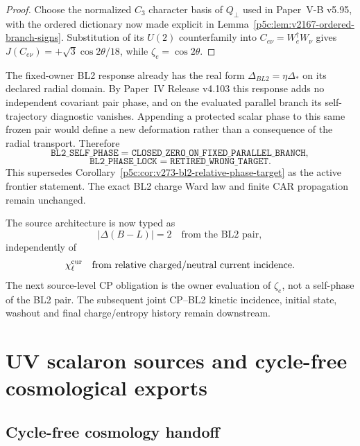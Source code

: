 \documentclass[12pt,a4paper]{article}
\begin{document}
\begin{proof}
Choose the normalized $C_3$ character basis of $Q_\perp$ used in Paper~V-B
v5.95, with the ordered dictionary now made explicit in
Lemma~\ref{p5c:lem:v2167-ordered-branch-signs}. Substitution of its $U(2)$ counterfamily into
$C_{e\nu}=W_e^\dagger W_\nu$ gives
$J(C_{e\nu})=+\sqrt3\cos2\theta/18$, while
$\zeta_e=\cos2\theta$.
\end{proof}

\begin{corollary}
\label{p5c:cor:v274-bl2-phase-lock-retired}
The fixed-owner BL2 response already has the real form
$\Delta_{BL2}=\eta\Delta_*$ on its declared radial domain.  By Paper~IV
Release v4.103 this response adds no independent covariant pair phase, and on
the evaluated parallel branch its self-trajectory diagnostic vanishes.
Appending a protected scalar phase to this same frozen pair would define a
new deformation rather than a consequence of the radial transport.  Therefore
\[
 \boxed{
 \texttt{BL2\_SELF\_PHASE}=\texttt{CLOSED\_ZERO\_ON\_FIXED\_PARALLEL\_BRANCH},}
\]
\[
 \boxed{
 \texttt{BL2\_PHASE\_LOCK}=\texttt{RETIRED\_WRONG\_TARGET}.}
\]
This supersedes Corollary~\ref{p5c:cor:v273-bl2-relative-phase-target} as the
active frontier statement.  The exact BL2 charge Ward law and finite CAR
propagation remain unchanged.
\end{corollary}

\begin{corollary}
\label{p5c:cor:v274-native-baryogenesis-frontier}
The source architecture is now typed as
\[
 |\Delta(B-L)|=2\quad\text{from the BL2 pair},
\]
independently of
\[
 \chi_\ell^{\rm cur}\quad\text{from relative charged/neutral current incidence}.
\]
The next source-level CP obligation is the owner evaluation of $\zeta_e$, not
a self-phase of the BL2 pair.  The subsequent joint CP--BL2 kinetic incidence,
initial state, washout and final charge/entropy history remain downstream.
\end{corollary}



\section{UV scalaron sources and cycle-free cosmological exports}
\label{p5c:sec:organized-cosmic}
\subsection{Cycle-free cosmology handoff}
\label{p7v2:sec:cosmology-handoff}
\end{document}
